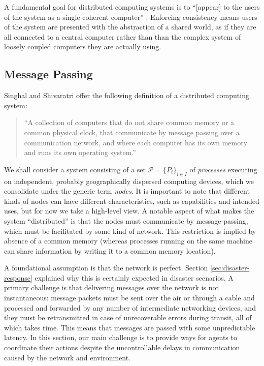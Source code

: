 \documentclass[]             %
{NASA}                       %
\theoremstyle{definition}
\begin{document}
A fundamental goal for distributed computing systems is to
``{[}appear{]} to the users of the system as a single coherent
computer'' \cite{TanenbaumSteen07}. Enforcing consistency means users
of the system are presented with the abstraction of a shared world, as
if they are all connected to a central computer rather than than the
complex system of loosely coupled computers they are actually using.

\subsection{Message Passing}
\label{ssec:message-passing}

Singhal and Shivaratri \cite{10.5555/562065} offer the following
definition of a distributed computing system:

\begin{quote}
  ``A collection of computers that do not share common memory or a common
  physical clock, that communicate by message passing over a communication
  network, and where each computer has its own memory and runs its own
  operating system.''
\end{quote}
We shall consider a system consisting of a set \(\mathcal{P} =
\{P_i\}_{i\in I}\) of \emph{processes} executing on independent,
probably geographically dispersed computing devices, which we
consolidate under the generic term \emph{nodes}. It is important to
note that different kinds of nodes can have different characteristics,
such as capabilities and intended uses, but for now we take a
high-level view. A notable aspect of what makes the system
``distributed'' is that the nodes must communicate by message-passing,
which must be facilitated by some kind of network. This restriction is
implied by absence of a common memory (whereas processes running on
the same machine can share information by writing it to a common
memory location).

A foundational assumption is that the network is perfect. Section
\ref{sec:disaster-response} explained why this is certainly expected
in disaster scenarios. A primary challenge is that delivering messages
over the network is not instantaneous: message packets must be sent
over the air or through a cable and processed and forwarded by any
number of intermediate networking devices, and they must be
retransmitted in case of unrecoverable errors during transit, all of
which takes time. This means that messages are passed with some
unpredictable latency. In this section, our main challenge is to
provide ways for agents to coordinate their actions despite the
uncontrollable delays in communication caused by the network and
environment.
\end{document}
